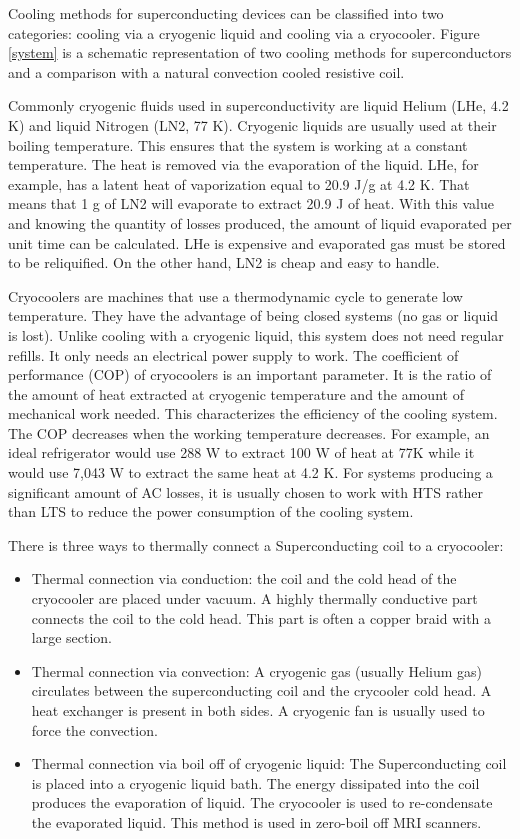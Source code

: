 \documentclass{ws-jmrr}
\begin{document}
\begin{multicols}{2}
Cooling methods for superconducting devices can be classified into two categories: cooling via a cryogenic liquid and cooling via a cryocooler. Figure \ref{system} is a schematic representation of two cooling methods for superconductors and a comparison with a natural convection cooled resistive coil.\par
Commonly cryogenic fluids used in superconductivity are liquid Helium (LHe, 4.2 K) and liquid Nitrogen (LN2, 77 K). Cryogenic liquids are usually used at their boiling temperature. This ensures that the system is working at a constant temperature. The heat is removed via the evaporation of the liquid. LHe, for example, has a latent heat of vaporization equal to 20.9 J/g at 4.2 K. That means that 1 g of LN2 will evaporate to extract 20.9 J of heat. With this value and knowing the quantity of losses produced, the amount of liquid evaporated per unit time can be calculated. LHe is expensive and evaporated gas must be stored to be reliquified. On the other hand, LN2 is cheap and easy to handle.\par
Cryocoolers are machines that use a thermodynamic cycle to generate low temperature. They have the advantage of being closed systems (no gas or liquid is lost). Unlike cooling with a cryogenic liquid, this system does not need regular refills. It only needs an electrical power supply to work. The coefficient of performance (COP) of cryocoolers is an important parameter. It is the ratio of the amount of heat extracted at cryogenic temperature and the amount of mechanical work needed. This characterizes the efficiency of the cooling system. The COP decreases when the working temperature decreases. For example, an ideal refrigerator would use 288 W to extract 100 W of heat at 77K while it would use 7,043 W to extract the same heat at 4.2 K. For systems producing a significant amount of AC losses, it is usually chosen to work with HTS rather than LTS to reduce the power consumption of the cooling system.\par
There is three ways to thermally connect a Superconducting coil to a cryocooler:
\begin{itemize}
\item Thermal connection via conduction: the coil and the cold head of the cryocooler are placed under vacuum. A highly thermally conductive part connects the coil to the cold head. This part is often a copper braid with a large section.
\item Thermal connection via convection: A cryogenic gas (usually Helium gas) circulates between the superconducting coil and the crycooler cold head. A heat exchanger is present in both sides. A cryogenic fan is usually used to force the convection.
\item  Thermal connection via boil off of cryogenic liquid: The Superconducting coil is placed into a cryogenic liquid bath. The energy dissipated into the coil produces the evaporation of liquid. The cryocooler is used to re-condensate the evaporated liquid. This method is used in zero-boil off MRI scanners.
\end{itemize}


\end{multicols}
\end{document}
